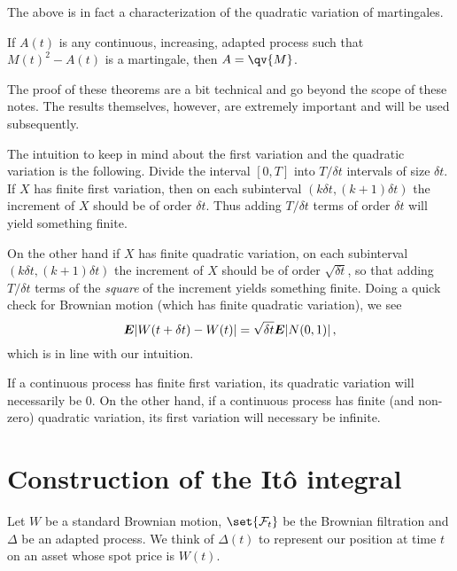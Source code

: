 The above is in fact a characterization of the quadratic variation of martingales.

\begin{theorem}\label{t:qv2}
  If $A(t)$ is any continuous, increasing, adapted process such that $M(t)^2 - A(t)$ is a martingale, then $A = \qv{M}$.
\end{theorem}

The proof of these theorems are a bit technical and go beyond the scope of these notes.
The results themselves, however, are extremely important and will be used subsequently.

\begin{remark}
  The intuition to keep in mind about the first variation and the quadratic variation is the following.
  Divide the interval $[0, T]$ into $T/\delta t$ intervals of size $\delta t$.
  If $X$ has finite first variation, then on each subinterval $(k \delta t, (k+1) \delta t)$ the increment of $X$ should be of order $\delta t$.
  Thus adding $T / \delta t$ terms of order $\delta t$ will yield something finite.

  On the other hand if $X$ has finite quadratic variation, on each subinterval $(k \delta t, (k+1) \delta t)$ the increment of $X$ should be of order $\sqrt{\delta t}$, so that adding $T / \delta t$ terms of the \emph{square} of the increment yields something finite.
  Doing a quick check for Brownian motion (which has finite quadratic variation), we see
  \begin{equation*}
    \bm{E} \lvert W(t + \delta t) - W(t)\rvert = \sqrt{\delta t} \bm{E} \lvert N(0, 1)\rvert\,,
  \end{equation*}
  which is in line with our intuition.
\end{remark}

\begin{remark}
  If a continuous process has finite first variation, its quadratic variation will necessarily be $0$.
  On the other hand, if a continuous process has finite (and non-zero) quadratic variation, its first variation will necessary be infinite.
\end{remark}


\section{Construction of the It\^o integral}

Let $W$ be a standard Brownian motion, $\set{\mathcal F_t}$ be the Brownian filtration and $\Delta$ be an adapted process.
We think of $\Delta(t)$ to represent our position at time $t$ on an asset whose spot price is $W(t)$.

